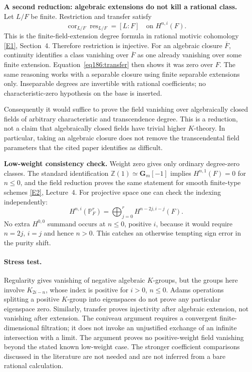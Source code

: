 \documentclass[11pt,a4paper]{article}
\newcommand{\Z}{\mathbb{Z}}
\newcommand{\PP}{\mathbb P}
\newcommand{\eref}[2]{\hyperlink{extra:#1:#2}{[E#2]}}
\numberwithin{equation}{section}
\begin{document}
\textbf{A second reduction: algebraic extensions do not kill a rational class.} Let $L/F$ be finite. Restriction and transfer satisfy
\begin{equation}\label{eq186:transfer}
 \operatorname{cor}_{L/F}\operatorname{res}_{L/F}=[L:F]
 \quad\text{on }H^{n,i}(F).
\end{equation}
This is the finite-field-extension degree formula in rational motivic cohomology \eref{statement}{1}, Section~4. Therefore restriction is injective. For an algebraic closure $\overline F$, continuity identifies a class vanishing over $\overline F$ as one already vanishing over some finite extension. Equation~\eqref{eq186:transfer} then shows it was zero over $F$. The same reasoning works with a separable closure using finite separable extensions only. Inseparable degrees are invertible with rational coefficients; no characteristic-zero hypothesis on the base is inserted.

Consequently it would suffice to prove the field vanishing over algebraically closed fields of arbitrary characteristic and transcendence degree. This is a reduction, not a claim that algebraically closed fields have trivial higher $K$-theory. In particular, taking an algebraic closure does not remove the transcendental field parameters that the cited paper identifies as difficult.

\textbf{Low-weight consistency check.} Weight zero gives only ordinary degree-zero classes. The standard identification $\Z(1)\simeq\mathbf G_m[-1]$ implies $H^{n,1}(F)=0$ for $n\le0$, and the field reduction proves the same statement for smooth finite-type schemes \eref{statement}{2}, Lecture~4. For projective space one can check the indexing independently:
\[
 H^{n,i}(\PP^r_F)=\bigoplus_{j=0}^{r}H^{n-2j,i-j}(F).
\]
No extra $H^{0,0}$ summand occurs at $n\le0$, positive $i$, because it would require $n=2j$, $i=j$ and hence $n>0$. This catches an otherwise tempting sign error in the purity shift.

\paragraph{Stress test.}
Regularity gives vanishing of negative algebraic $K$-groups, but the groups here involve $K_{2i-n}$, whose index is positive for $i>0$, $n\le0$. Adams operations splitting a positive $K$-group into eigenspaces do not prove any particular eigenspace zero. Similarly, transfer proves injectivity after algebraic extension, not vanishing after extension. The coniveau argument requires a convergent finite-dimensional filtration; it does not invoke an unjustified exchange of an infinite intersection with a limit. The argument proves no positive-weight field vanishing beyond the stated known low-weight case. The stronger coefficient comparisons discussed in the literature are not needed and are not inferred from a bare rational calculation.
\end{document}
